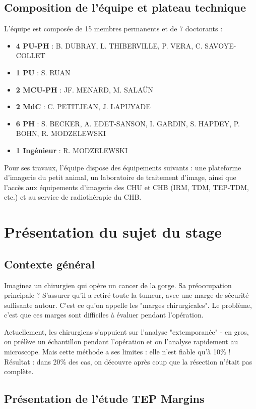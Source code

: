 \documentclass[11pt,a4paper]{report}
\begin{document}
\section{Composition de l'équipe et plateau technique}

L'équipe est composée de 15 membres permanents et de 7 doctorants :

\begin{itemize}
\item \textbf{4 PU-PH} : B. DUBRAY, L. THIBERVILLE, P. VERA, C. SAVOYE-COLLET
\item \textbf{1 PU} : S. RUAN
\item \textbf{2 MCU-PH} : JF. MENARD, M. SALAÜN
\item \textbf{2 MdC} : C. PETITJEAN, J. LAPUYADE
\item \textbf{6 PH} : S. BECKER, A. EDET-SANSON, I. GARDIN, S. HAPDEY, P. BOHN, R. MODZELEWSKI
\item \textbf{1 Ingénieur} : R. MODZELEWSKI
\end{itemize}

Pour ses travaux, l'équipe dispose des équipements suivants : une plateforme d'imagerie du petit animal, un laboratoire de traitement d'image, ainsi que l'accès aux équipements d'imagerie des CHU et CHB (IRM, TDM, TEP-TDM, etc.) et au service de radiothérapie du CHB.

\chapter{Présentation du sujet du stage}

\section{Contexte général}

Imaginez un chirurgien qui opère un cancer de la gorge. Sa préoccupation principale ? S'assurer qu'il a retiré toute la tumeur, avec une marge de sécurité suffisante autour. C'est ce qu'on appelle les "marges chirurgicales". Le problème, c'est que ces marges sont difficiles à évaluer pendant l'opération.

Actuellement, les chirurgiens s'appuient sur l'analyse "extemporanée" - en gros, on prélève un échantillon pendant l'opération et on l'analyse rapidement au microscope. Mais cette méthode a ses limites : elle n'est fiable qu'à 10\% ! Résultat : dans 20\% des cas, on découvre après coup que la résection n'était pas complète.

\section{Présentation de l'étude TEP Margins}
\end{document}

